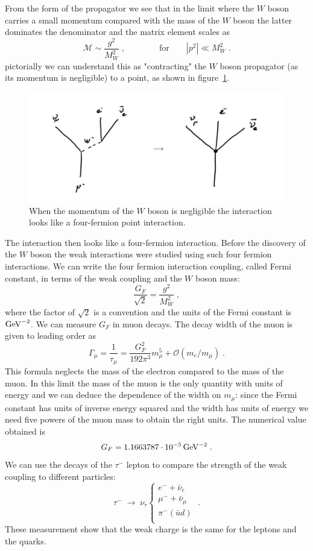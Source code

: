 \documentclass[12pt]{article}
\begin{document}
From the form of the propagator we see that in the limit where the $W$ boson carries a small momentum compared with the mass of the $W$ boson the latter dominates the denominator and the matrix element scales as
\[\mathcal{M}\sim \frac{g^2}{M_W^2}\;, \qquad\qquad\mbox{for}\qquad |p^2|\ll M_W^2\;.\]
pictorially we can understand this as "contracting" the $W$ boson propagator (as its momentum is negligible) to a point, as shown in figure~\ref{fig:fermi}.
\begin{figure}
\begin{center}
\includegraphics[scale=0.2]{images/FermiTheory.png}
\end{center}
\caption{When the momentum of the $W$ boson is negligible the interaction looks like a four-fermion point interaction.}\label{fig:fermi}
\end{figure}  
The interaction then looks like a four-fermion interaction. Before the discovery of the $W$ boson the weak interactions were studied using such four fermion interactions. We can write the four fermion interaction coupling, called Fermi constant, in terms of the weak coupling and the $W$ boson mass:
\[\frac{G_F}{\sqrt{2}}=\frac{g^2}{M_W^2}\;,\]
where the factor of $\sqrt2$ is a convention and the units of the Fermi constant is ${\rm GeV}^{-2}$. We can measure $G_F$ in muon decays. The decay width of the muon is given to leading order as
\[\Gamma_\mu=\frac{1}{\tau_\mu}=\frac{G_F^2}{192\pi^3}m_\mu^5+\mathcal{O}(m_e/m_\mu)\;.\]
This formula neglects the mass of the electron compared to the mass of the muon. In this limit the mass of the muon is the only quantity with units of energy and we can deduce the dependence of the width on $m_\mu$: since the Fermi constant has units of inverse energy squared and the width has units of energy we need five powers of the muon mass to obtain the right units. The numerical value obtained is 
\[G_F=1.1663787\cdot 10^{-5}\,{\rm GeV^{-2}}\;.\]
We can use the decays of the $\tau^-$ lepton to compare the strength of the weak coupling to different particles:
\[\tau^-\;\rightarrow\;\nu_\tau \left\{ \begin{array}{c}
e^-+\bar \nu_e\\
\mu^-+\bar \nu_\mu\\
\pi^- (\bar u d)\\
\end{array} \right.
\;.\] 
These measurement show that the weak charge is the same for the leptons and the quarks.
%
%
\end{document}
